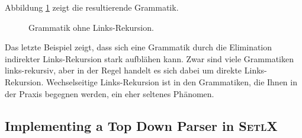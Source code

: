Abbildung \ref{fig:mutual-left-recursion-2} zeigt die resultierende Grammatik.


\begin{figure}[htbp]
  \begin{center}    
  \end{center}
  \caption{Grammatik ohne Links-Rekursion.}
  \label{fig:mutual-left-recursion-2}
\end{figure}

Das letzte Beispiel zeigt, dass sich eine Grammatik durch die Elimination indirekter Links-Rekursion
stark aufbl\"ahen kann.  Zwar sind viele Grammatiken links-rekursiv, aber in der Regel
handelt es sich dabei um direkte Links-Rekursion.  Wechselseitige Links-Rekursion ist in den
Grammatiken, die Ihnen in der Praxis begegnen werden, ein eher seltenes Ph\"anomen.


\subsection{Implementing a Top Down Parser in \textsc{SetlX}}


